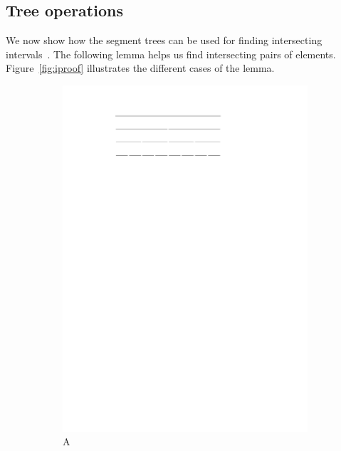 \documentclass[english,gradu]{tktltiki2018}
\begin{document}
\subsection{Tree operations}\label{sec:treeops}

We now show how the segment trees can be used for finding intersecting intervals~\cite[Chapter 10]{berg2008}.
The following lemma helps us find intersecting pairs of elements.
Figure~\ref{fig:iproof} illustrates the different cases of the lemma.

\begin{figure}\centering
	\begin{subfigure}[t]{0.3\textwidth}\centering
		\includegraphics[width=\textwidth,page=3]{fig/iproof}
		\caption{A}\label{fig:iproof:common}
	\end{subfigure}
	\hfil
	\begin{subfigure}[t]{0.3\textwidth}\centering

\end{subfigure}
\end{figure}
\end{document}
